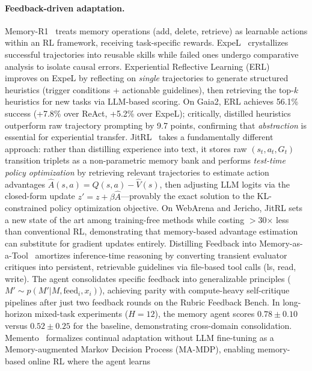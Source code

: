 \documentclass[hf]{ceurart}
\begin{document}
\paragraph{Feedback-driven adaptation.}
Memory-R1~\cite{memoryr12025} treats memory operations (add, delete,
retrieve) as learnable actions within an RL framework, receiving
task-specific rewards. ExpeL~\cite{expel2024} crystallizes successful
trajectories into reusable skills while failed ones undergo
comparative analysis to isolate causal errors.
Experiential Reflective Learning (ERL)~\cite{erl2026} improves on
ExpeL by reflecting on \emph{single} trajectories to generate
structured heuristics (trigger conditions + actionable guidelines),
then retrieving the top-$k$ heuristics for new tasks via LLM-based
scoring. On Gaia2, ERL achieves 56.1\% success (+7.8\% over ReAct,
+5.2\% over ExpeL); critically, distilled heuristics outperform raw
trajectory prompting by 9.7 points, confirming that
\emph{abstraction} is essential for experiential transfer.
JitRL~\cite{jitrl2026} takes a fundamentally different approach:
rather than distilling experience into text, it stores raw
$(s_t, a_t, G_t)$ transition triplets as a non-parametric memory
bank and performs \emph{test-time policy optimization} by retrieving
relevant trajectories to estimate action advantages
$\hat{A}(s,a) = \hat{Q}(s,a) - \hat{V}(s)$, then adjusting LLM
logits via the closed-form update $z' = z + \beta\hat{A}$---provably
the exact solution to the KL-constrained policy optimization
objective. On WebArena and Jericho, JitRL sets a new state of the
art among training-free methods while costing $>$30$\times$ less
than conventional RL, demonstrating that memory-based advantage
estimation can substitute for gradient updates entirely.
Distilling Feedback into Memory-as-a-Tool~\cite{feedbackmem2026}
amortizes inference-time reasoning by converting transient evaluator
critiques into persistent, retrievable guidelines via file-based
tool calls (ls, read, write). The agent consolidates specific
feedback into generalizable principles ($M' \sim p(M' | M,
\text{feed}_i, x_i)$), achieving parity with compute-heavy
self-critique pipelines after just two feedback rounds on the
Rubric Feedback Bench. In long-horizon mixed-task experiments
($H{=}12$), the memory agent scores $0.78 \pm 0.10$ versus
$0.52 \pm 0.25$ for the baseline, demonstrating cross-domain
consolidation.
Memento~\cite{memento2025} formalizes continual adaptation without
LLM fine-tuning as a Memory-augmented Markov Decision Process
(MA-MDP), enabling memory-based online RL where the agent learns
\end{document}
